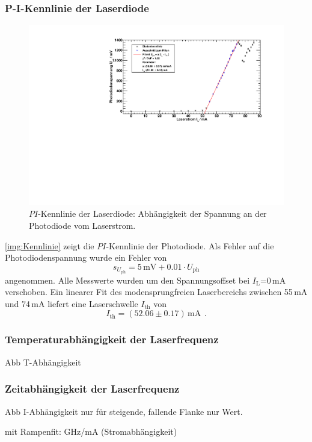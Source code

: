 \subsubsection*{P-I-Kennlinie der Laserdiode}
\begin{figure}[H]
\begin{center}
  \includegraphics[width=\textwidth]{../img/part1/diodenkennlinie.pdf}
  \caption{$PI$-Kennlinie der Laserdiode: Abhängigkeit der Spannung  %
  an der Photodiode vom Laserstrom.}
  \label{img:Kennlinie}
\end{center}
\end{figure} 
\autoref{img:Kennlinie} zeigt die $PI$-Kennlinie der Photodiode.
Als Fehler auf die Photodiodenspannung wurde ein Fehler von
\begin{equation}
  s_{U_{\text{ph}}}= 5\,\text{mV} + 0.01 \cdot U_{\text{ph}}
\end{equation}
angenommen. %
Alle Messwerte wurden um den Spannungsoffset bei $I_{\text{L}}$=0\,mA verschoben.
Ein linearer Fit des modensprungfreien Laserbereichs zwischen 55\,mA und 74\,mA
liefert eine Laserschwelle $I_{\text{th}}$ von
\begin{equation}
  I_{\text{th}}=(52.06\pm0.17)\,\text{mA} \ \, .
\end{equation}

\subsubsection*{Temperaturabhängigkeit der Laserfrequenz}
Abb T-Abhängigkeit

\subsubsection*{Zeitabhängigkeit der Laserfrequenz} 

Abb I-Abhängigkeit nur für steigende,
fallende Flanke nur Wert.

mit Rampenfit: GHz/mA (Stromabhängigkeit)